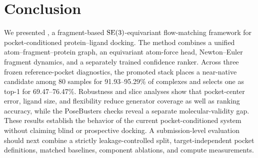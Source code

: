\section{Conclusion}
\label{sec:conclusion}

We presented \method, a fragment-based \(\mathrm{SE}(3)\)-equivariant flow-matching
framework for pocket-conditioned protein--ligand docking. The method combines
a unified atom--fragment--protein graph, an equivariant atom-force head,
Newton--Euler fragment dynamics, and a separately trained confidence ranker.
Across three frozen reference-pocket diagnostics, the promoted stack places a
near-native candidate among 80 samples for 91.93--95.29\% of complexes and
selects one as top-1 for 69.47--76.47\%. Robustness and slice analyses show
that pocket-center error, ligand size, and flexibility reduce generator
coverage as well as ranking accuracy, while the PoseBusters checks reveal a
separate molecular-validity gap. These results establish the behavior of the
current pocket-conditioned system without claiming blind or prospective
docking. A submission-level evaluation should next combine a strictly
leakage-controlled split, target-independent pocket definitions, matched
baselines, component ablations, and compute measurements.
